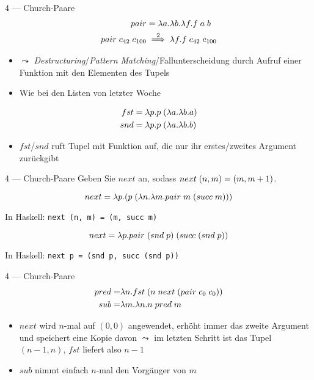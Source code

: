 \documentclass{beamer}
\begin{document}
\begin{frame}{4 --- Church-Paare}
	\begin{eqnarray*}
		pair &= \lambda{}a.\lambda{}b.\lambda{}f.f\;{}a\;{}b \\
		pair\;{}c_{42}\;{}c_{100} &\stackrel{2}{\implies} \lambda{}f.f\;{}c_{42}\;{}c_{100}
	\end{eqnarray*}

	\begin{itemize}
		\item $\leadsto$ \emph{Destructuring}/\emph{Pattern Matching}/Fallunterscheidung durch Aufruf einer Funktion mit den Elementen des Tupels
		\item Wie bei den Listen von letzter Woche
	\end{itemize}

	\begin{eqnarray*}
		fst &= \lambda{}p.p\;{}(\lambda{}a.\lambda{}b.a) \\
		snd &= \lambda{}p.p\;{}(\lambda{}a.\lambda{}b.b)
	\end{eqnarray*}

	\begin{itemize}
		\item $fst$/$snd$ ruft Tupel mit Funktion auf, die nur ihr erstes/zweites Argument zurückgibt
	\end{itemize}
\end{frame}

\begin{frame}{4 --- Church-Paare}
	Geben Sie $next$ an, sodass $next\;{}(n, m) = (m, m + 1)$.

	\pause

	\begin{equation*}
		next = \lambda{}p.(p\;{}(\lambda{}n.\lambda{}m.pair\;{}m\;{}(succ\;{}m)))
	\end{equation*}

	In Haskell: \texttt{next (n, m) = (m, succ m)}

	\pause

	\begin{equation*}
		next = \lambda{}p.pair\;{}(snd\;{}p)\;{}(succ\;{}(snd\;{}p))
	\end{equation*}

	In Haskell: \texttt{next p = (snd p, succ (snd p))}
\end{frame}

\begin{frame}{4 --- Church-Paare}
	\begin{eqnarray*}
		pred =& \lambda{}n.fst\;{}(n\;{}next\;{}(pair\;{}c_0\;{}c_0)) \\
		sub =& \lambda{}m.\lambda{}n.n\;{}pred\;{}m
	\end{eqnarray*}

	\begin{itemize}
		\item $next$ wird $n$-mal auf $(0, 0)$ angewendet, erhöht immer das zweite Argument und speichert eine Kopie davon $\leadsto$ im letzten Schritt ist das Tupel $(n - 1, n)$, $fst$ liefert also $n - 1$
		\item $sub$ nimmt einfach $n$-mal den Vorgänger von $m$
	\end{itemize}
\end{frame}
\end{document}
